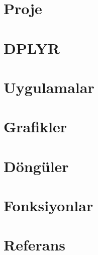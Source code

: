 \documentclass[
]{book}
\begin{document}
\hypertarget{proje}{%
\chapter{Proje}\label{proje}}

\hypertarget{dplyr}{%
\chapter{DPLYR}\label{dplyr}}

\hypertarget{uygulamalar}{%
\chapter{Uygulamalar}\label{uygulamalar}}

\hypertarget{grafikler}{%
\chapter{Grafikler}\label{grafikler}}

\hypertarget{duxf6nguxfcler}{%
\chapter{Döngüler}\label{duxf6nguxfcler}}

\hypertarget{fonksiyonlar}{%
\chapter{Fonksiyonlar}\label{fonksiyonlar}}

\hypertarget{referans}{%
\chapter{Referans}\label{referans}}

  
\end{document}
